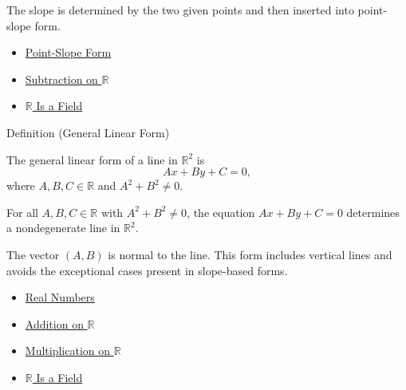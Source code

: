 \begin{remark*}[Interpretation]
The slope is determined by the two given points and then inserted into
point-slope form.
\end{remark*}

\begin{dependencies}
\begin{itemize}
  \item \hyperref[def:point-slope-form]{Point-Slope Form}
  \item \hyperref[def:subtraction-on-r]{Subtraction on $\mathbb{R}$}
  \item \hyperref[thm:r-is-a-field]{$\mathbb{R}$ Is a Field}
\end{itemize}
\end{dependencies}

\begin{definitionbox}{Definition (General Linear Form)}
\begin{definition}\label{def:general-linear-form}
The general linear form of a line in $\mathbb{R}^2$ is
\[
  Ax+By+C=0,
\]
where $A,B,C\in\mathbb{R}$ and $A^2+B^2\neq 0$.
\end{definition}
\end{definitionbox}

\begin{remark*}
For all $A,B,C\in\mathbb{R}$ with $A^2+B^2\neq 0$, the equation
$Ax+By+C=0$ determines a nondegenerate line in $\mathbb{R}^2$.
\end{remark*}

\begin{remark*}[Interpretation]
The vector $(A,B)$ is normal to the line. This form includes vertical lines
and avoids the exceptional cases present in slope-based forms.
\end{remark*}

\begin{dependencies}
\begin{itemize}
  \item \hyperref[def:reals]{Real Numbers}
  \item \hyperref[def:addition-on-r]{Addition on $\mathbb{R}$}
  \item \hyperref[def:multiplication-on-r]{Multiplication on $\mathbb{R}$}
  \item \hyperref[thm:r-is-a-field]{$\mathbb{R}$ Is a Field}
\end{itemize}
\end{dependencies}


